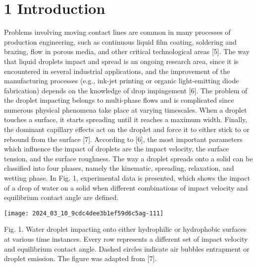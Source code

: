 \documentclass[10pt]{article}
\begin{document}
\section*{1 Introduction}
Problems involving moving contact lines are common in many processes of production engineering, such as continuous liquid film coating, soldering and brazing, flow in porous media, and other critical technological areas [5]. The way that liquid droplets impact and spread is an ongoing research area, since it is encountered in several industrial applications, and the improvement of the manufacturing processes (e.g., ink-jet printing or organic light-emitting diode fabrication) depends on the knowledge of drop impingement [6]. The problem of the droplet impacting belongs to multi-phase flows and is complicated since numerous physical phenomena take place at varying timescales. When a droplet touches a surface, it starts spreading until it reaches a maximum width. Finally, the dominant capillary effects act on the droplet and force it to either stick to or rebound from the surface [7]. According to [6], the most important parameters which influence the impact of droplets are the impact velocity, the surface tension, and the surface roughness. The way a droplet spreads onto a solid can be classified into four phases, namely the kinematic, spreading, relaxation, and wetting phase. In Fig. 1, experimental data is presented, which shows the impact of a drop of water on a solid when different combinations of impact velocity and equilibrium contact angle are defined.

\begin{center}
\texttt{[image: 2024\_03\_10\_9cdc4dee3b1ef59d6c5ag-111]}
\end{center}

Fig. 1. Water droplet impacting onto either hydrophilic or hydrophobic surfaces at various time instances. Every row represents a different set of impact velocity and equilibrium contact angle. Dashed circles indicate air bubbles entrapment or droplet emission. The figure was adapted from [7].
\end{document}
